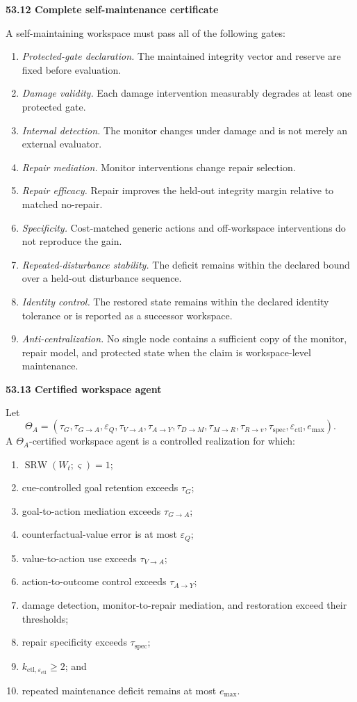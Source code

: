 \documentclass[11pt,letterpaper]{article}
\newcommand{\SRW}{\operatorname{SRW}}
\newcommand{\subtopic}[1]{%
 \vspace{0.45em}
 {\bfseries\color{AccentColor} #1\par}
}
\theoremstyle{plain}
\theoremstyle{definition}
\begin{document}
\subtopic{53.12 Complete self-maintenance certificate}

A self-maintaining workspace must pass all of the following gates:
\begin{enumerate}
\item \emph{Protected-gate declaration.} The maintained integrity vector and
 reserve are fixed before evaluation.
\item \emph{Damage validity.} Each damage intervention measurably degrades at
 least one protected gate.
\item \emph{Internal detection.} The monitor changes under damage and is not
 merely an external evaluator.
\item \emph{Repair mediation.} Monitor interventions change repair selection.
\item \emph{Repair efficacy.} Repair improves the held-out integrity margin
 relative to matched no-repair.
\item \emph{Specificity.} Cost-matched generic actions and off-workspace
 interventions do not reproduce the gain.
\item \emph{Repeated-disturbance stability.} The deficit remains within the
 declared bound over a held-out disturbance sequence.
\item \emph{Identity control.} The restored state remains within the declared
 identity tolerance or is reported as a successor workspace.
\item \emph{Anti-centralization.} No single node contains a sufficient copy
 of the monitor, repair model, and protected state when the claim is
 workspace-level maintenance.
\end{enumerate}

\subtopic{53.13 Certified workspace agent}

Let
\[
\Theta_A
=
\left(
\tau_G,
\tau_{G\to A},
\varepsilon_Q,
\tau_{V\to A},
\tau_{A\to Y},
\tau_{D\to M},
\tau_{M\to R},
\tau_{R\to v},
\tau_{\mathrm{spec}},
\varepsilon_{\mathrm{ctl}},
 e_{\max}
\right).
\]
A \(\Theta_A\)-certified workspace agent is a controlled realization for
which:
\begin{enumerate}
\item \(\SRW(W_t;\varsigma)=1\);
\item cue-controlled goal retention exceeds \(\tau_G\);
\item goal-to-action mediation exceeds \(\tau_{G\to A}\);
\item counterfactual-value error is at most \(\varepsilon_Q\);
\item value-to-action use exceeds \(\tau_{V\to A}\);
\item action-to-outcome control exceeds \(\tau_{A\to Y}\);
\item damage detection, monitor-to-repair mediation, and restoration exceed
 their thresholds;
\item repair specificity exceeds \(\tau_{\mathrm{spec}}\);
\item \(k_{\mathrm{ctl},\varepsilon_{\mathrm{ctl}}}\geq2\); and
\item repeated maintenance deficit remains at most \(e_{\max}\).
\end{enumerate}
\end{document}
